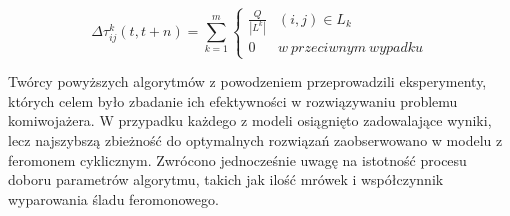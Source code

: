{    \begin{equation}\label{eqt:pheromone-cycle}
        \Delta\tau_{ij}^k(t, t + n) = \sum_{k=1}^m \left\{
                \begin{matrix}
                    \frac{Q}{|L^k|} & (i, j) \in L_k\\
                    0 & w\ przeciwnym\ wypadku
                \end{matrix}
            \right.
    \end{equation}

    Twórcy powyższych algorytmów z powodzeniem przeprowadzili eksperymenty, których celem było zbadanie ich efektywności
    w rozwiązywaniu problemu komiwojażera. W przypadku każdego z modeli osiągnięto zadowalające wyniki, lecz najszybszą
    zbieżność do optymalnych rozwiązań zaobserwowano w modelu z feromonem cyklicznym. Zwrócono jednocześnie uwagę na
    istotność procesu doboru parametrów algorytmu, takich jak ilość mrówek i współczynnik wyparowania śladu
    feromonowego.







}

